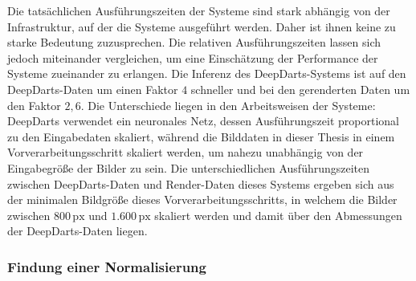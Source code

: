 Die tatsächlichen Ausführungszeiten der Systeme sind stark abhängig von der Infrastruktur, auf der die Systeme ausgeführt werden. Daher ist ihnen keine zu starke Bedeutung zuzusprechen. Die relativen Ausführungszeiten lassen sich jedoch miteinander vergleichen, um eine Einschätzung der Performance der Systeme zueinander zu erlangen. Die Inferenz des DeepDarts-Systems ist auf den DeepDarts-Daten um einen Faktor $4$ schneller und bei den gerenderten Daten um den Faktor $2,\!6$. Die Unterschiede liegen in den Arbeitsweisen der Systeme: DeepDarts verwendet ein neuronales Netz, dessen Ausführungszeit proportional zu den Eingabedaten skaliert, während die Bilddaten in dieser Thesis in einem Vorverarbeitungsschritt skaliert werden, um nahezu unabhängig von der Eingabegröße der Bilder zu sein. Die unterschiedlichen Ausführungszeiten zwischen DeepDarts-Daten und Render-Daten dieses Systems ergeben sich aus der minimalen Bildgröße dieses Vorverarbeitungsschritts, in welchem die Bilder zwischen $800\,\text{px}$ und $1.600\,\text{px}$ skaliert werden und damit über den Abmessungen der DeepDarts-Daten liegen.

\subsubsection{Findung einer Normalisierung} %
\label{sec:findung_normalisierung}

\CVNorm

